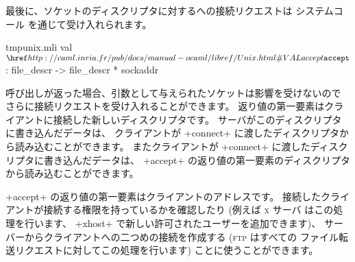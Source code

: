 最後に、ソケットのディスクリプタに対するへの接続リクエストは
システムコール  を通じて受け入れられます。
%
\begin{listingcodefile}{tmpunix.mli}
val $\libvalue{Unix}{accept}$ : file_descr -> file_descr * sockaddr
\end{listingcodefile}
%
呼び出しが返った場合、引数として与えられたソケットは影響を受けないので
さらに接続リクエストを受け入れることができます。
返り値の第一要素はクライアントに接続した新しいディスクリプタです。
サーバがこのディスクリプタに書き込んだデータは、
クライアントが \ml+connect+ に渡したディスクリプタから読み込むことができます。
またクライアントが \ml+connect+ に渡したディスクリプタに書き込んだデータは、
\ml+accept+ の返り値の第一要素のディスクリプタから読み込むことができます。

\ml+accept+ の返り値の第一要素はクライアントのアドレスです。
接続したクライアントが接続する権限を持っているかを確認したり (例えば \textsc{x} サーバ
はこの処理を行います、 \ml+xhost+ で新しい許可されたユーザーを追加できます)、
サーバーからクライアントへの二つめの接続を作成する (\textsc{ftp} はすべての
ファイル転送リクエストに対してこの処理を行います) ことに使うことができます。

